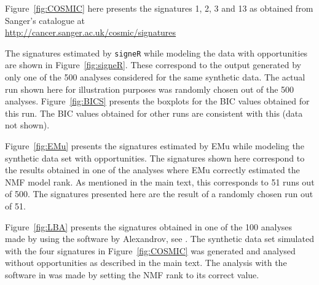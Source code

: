 \documentclass[11pt]{amsart}
\theoremstyle{definition}
\begin{document}
Figure~\ref{fig:COSMIC} here presents the signatures 1, 2, 3 and 13 as
obtained from Sanger's catalogue at\\
\indent\indent\url{http://cancer.sanger.ac.uk/cosmic/signatures}

The signatures estimated by \texttt{signeR} while modeling the data
with opportunities are shown in Figure~\ref{fig:signeR}. These
correspond to the output generated by only one of the 500 analyses
considered for the same synthetic data. The actual run shown here for
illustration purposes was randomly chosen out of the 500 analyses.
Figure~\ref{fig:BICS} presents the boxplots for the BIC values
obtained for this run. The BIC values obtained for other runs are
consistent with this (data not shown).

Figure~\ref{fig:EMu} presents the signatures estimated by EMu  while
modeling the synthetic data set with opportunities. The signatures
shown here correspond to the results obtained in one of the analyses
where EMu correctly estimated the NMF model rank. As mentioned in the
main text, this corresponds to 51 runs out of 500. The signatures
presented here are the result of a randomly chosen run out of 51.

Figure~\ref{fig:LBA} presents the signatures obtained in one of the
100 analyses made by using the software by Alexandrov, see
\cite{A}. The synthetic data set simulated with the four signatures in
Figure~\ref{fig:COSMIC} was generated and analysed without
opportunities as described in the main text. The analysis with the
software in \cite{A} was made by setting the NMF rank to its correct
value.

\end{document}

